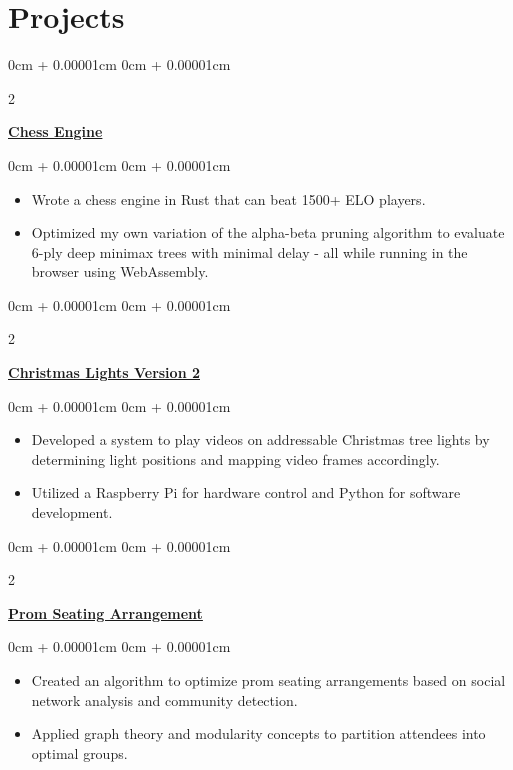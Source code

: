 \documentclass[10pt, letterpaper]{article}
\newenvironment{highlights}{
    \begin{itemize}[
        topsep=0.10cm,
        parsep=0.10cm,
        partopsep=0pt,
        itemsep=0pt,
        leftmargin=0cm + 10pt
    ]
}{
    \end{itemize}
}
\newenvironment{onecolentry}{
    \begin{adjustwidth}{
        0cm + 0.00001cm
    }{
        0cm + 0.00001cm
    }
}{
    \end{adjustwidth}
}
\newenvironment{twocolentry}[2][]{
    \onecolentry
    \def\secondColumn{#2}
    \setcolumnwidth{\fill, 5.5 cm} %
    \begin{paracol}{2}
}{
    \switchcolumn \raggedleft \secondColumn
    \end{paracol}
    \endonecolentry
}
\begin{document}
    \section{Projects}

    \begin{twocolentry}{}
        \textbf{\href{https://blucardin.github.io/projects/chess_engine/}{Chess Engine}}
    \end{twocolentry}
    \vspace{0.10cm}
    \begin{onecolentry}
        \begin{highlights}
            \item Wrote a chess engine in Rust that can beat 1500+ ELO players. 
            \item Optimized my own variation of the alpha-beta pruning algorithm to evaluate 6-ply deep minimax trees with minimal delay - all while running in the browser using WebAssembly.
        \end{highlights}
    \end{onecolentry}

    \vspace{0.2cm}

    \begin{twocolentry}{}
        \textbf{\href{https://blucardin.github.io/projects/christmas-lights-v2/}{Christmas Lights Version 2}}
    \end{twocolentry}
    \vspace{0.10cm}
    \begin{onecolentry}
        \begin{highlights}
            \item Developed a system to play videos on addressable Christmas tree lights by determining light positions and mapping video frames accordingly.
            \item Utilized a Raspberry Pi for hardware control and Python for software development.
        \end{highlights}
    \end{onecolentry}

        \vspace{0.2cm}

    \begin{twocolentry}{}
        \textbf{\href{https://blucardin.github.io/projects/prom_seating/}{Prom Seating Arrangement}}
    \end{twocolentry}
    \vspace{0.10cm}
    \begin{onecolentry}
        \begin{highlights}
            \item Created an algorithm to optimize prom seating arrangements based on social network analysis and community detection.
            \item Applied graph theory and modularity concepts to partition attendees into optimal groups.
        \end{highlights}
    \end{onecolentry}
\end{document}
